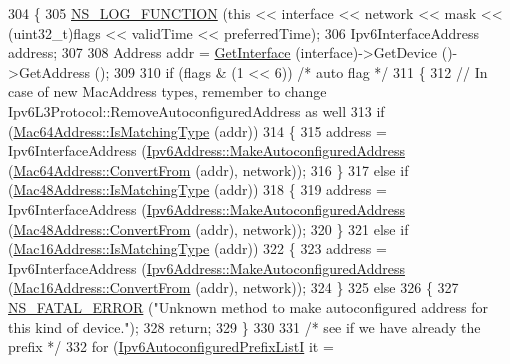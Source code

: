 \begin{DoxyCode}
304 \{
305   \hyperlink{log-macros-disabled_8h_a90b90d5bad1f39cb1b64923ea94c0761}{NS\_LOG\_FUNCTION} (\textcolor{keyword}{this} << interface << network << mask << (uint32\_t)flags << validTime << 
      preferredTime);
306   Ipv6InterfaceAddress address;
307 
308   Address addr = \hyperlink{classns3_1_1Ipv6L3Protocol_a2e53b72d76bceb713f2d3cb54e24f5a1}{GetInterface} (interface)->GetDevice ()->GetAddress ();
309 
310   \textcolor{keywordflow}{if} (flags & (1 << 6)) \textcolor{comment}{/* auto flag */}
311     \{
312       \textcolor{comment}{// In case of new MacAddress types, remember to change Ipv6L3Protocol::RemoveAutoconfiguredAddress as
       well}
313       \textcolor{keywordflow}{if} (\hyperlink{classns3_1_1Mac64Address_a50014d1350f72b89857f0262be927073}{Mac64Address::IsMatchingType} (addr))
314         \{
315           address = Ipv6InterfaceAddress (\hyperlink{classns3_1_1Ipv6Address_a74e6a79f61e9edd0ebdbafb4db88dc35}{Ipv6Address::MakeAutoconfiguredAddress}
       (\hyperlink{classns3_1_1Mac64Address_a9d73aef28cf6b6edf423b418ce014b10}{Mac64Address::ConvertFrom} (addr), network));
316         \}
317       \textcolor{keywordflow}{else} \textcolor{keywordflow}{if} (\hyperlink{classns3_1_1Mac48Address_a55cc1e3c6aa63fd1a4f8f7d9be4ae182}{Mac48Address::IsMatchingType} (addr))
318         \{
319           address = Ipv6InterfaceAddress (\hyperlink{classns3_1_1Ipv6Address_a74e6a79f61e9edd0ebdbafb4db88dc35}{Ipv6Address::MakeAutoconfiguredAddress}
       (\hyperlink{classns3_1_1Mac48Address_a911ce13603a9ef837545a032b6523ae4}{Mac48Address::ConvertFrom} (addr), network));
320         \}
321       \textcolor{keywordflow}{else} \textcolor{keywordflow}{if} (\hyperlink{classns3_1_1Mac16Address_a2d7aa9e24afc8e02a25ab449b0b99b1f}{Mac16Address::IsMatchingType} (addr))
322         \{
323           address = Ipv6InterfaceAddress (\hyperlink{classns3_1_1Ipv6Address_a74e6a79f61e9edd0ebdbafb4db88dc35}{Ipv6Address::MakeAutoconfiguredAddress}
       (\hyperlink{classns3_1_1Mac16Address_a6822cde696a7be24782dc8e1de2f1449}{Mac16Address::ConvertFrom} (addr), network));
324         \}
325       \textcolor{keywordflow}{else}
326         \{
327           \hyperlink{group__fatal_ga5131d5e3f75d7d4cbfd706ac456fdc85}{NS\_FATAL\_ERROR} (\textcolor{stringliteral}{"Unknown method to make autoconfigured address for this kind of
       device."});
328           \textcolor{keywordflow}{return};
329         \}
330 
331       \textcolor{comment}{/* see if we have already the prefix */}
332       \textcolor{keywordflow}{for} (\hyperlink{classns3_1_1Ipv6L3Protocol_af00957df9fbda1b1427ad41dd788b99a}{Ipv6AutoconfiguredPrefixListI} it = 

\end{DoxyCode}
